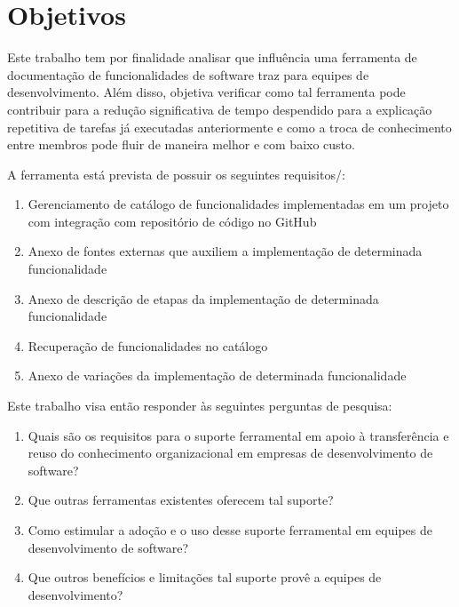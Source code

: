 \chapter{Objetivos}

Este trabalho tem por finalidade analisar que influência uma ferramenta de documentação de funcionalidades de software traz para equipes de desenvolvimento. Além disso, objetiva verificar como tal ferramenta pode contribuir para a redução significativa de tempo despendido para a explicação repetitiva de tarefas já executadas anteriormente e como a troca de conhecimento entre membros pode fluir de maneira melhor e com baixo custo.

A ferramenta está prevista de possuir os seguintes requisitos{/}:

\begin{enumerate}
\item Gerenciamento de catálogo de funcionalidades implementadas em um projeto com integração com repositório de código no GitHub
\item Anexo de fontes externas que auxiliem a implementação de determinada funcionalidade
\item Anexo de descrição de etapas da implementação de determinada funcionalidade
\item Recuperação de funcionalidades no catálogo
\item Anexo de variações da implementação de determinada funcionalidade
\end{enumerate}


Este trabalho visa então responder às seguintes perguntas de pesquisa:

\begin{enumerate}
\item Quais são os requisitos para o suporte ferramental em apoio à transferência e reuso do conhecimento organizacional em empresas de desenvolvimento de software?
\item Que outras ferramentas existentes oferecem tal suporte?
\item Como estimular a adoção e o uso desse suporte ferramental em equipes de desenvolvimento de software? 
\item Que outros benefícios e limitações tal suporte provê a equipes de desenvolvimento?

\end{enumerate}

